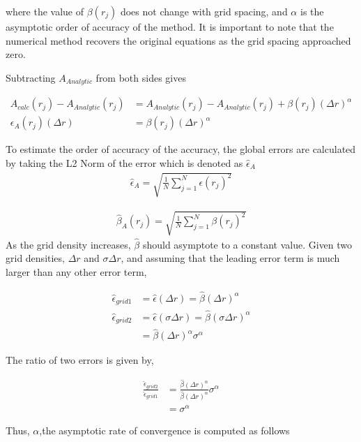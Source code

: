 where the value of $\beta(r_j)$ does not change with grid spacing, and 
$\alpha$ is the asymptotic order of accuracy of the method. It is important to
note that the numerical method recovers the original equations as the grid 
spacing approached zero.

Subtracting $A_{Analytic}$ from both sides gives

\begin{align*}
    A_{calc}(r_j) - A_{Analytic}(r_j) &= A_{Analytic}(r_j) - A_{Analytic}(r_j)
    + \beta(r_j) (\Delta r)^{\alpha} \\
    \epsilon_A(r_j)(\Delta r) &= \beta(r_j) (\Delta r)^{\alpha}
\end{align*}

To estimate the order of accuracy of the accuracy, the global errors 
are calculated by taking the L2 Norm of the error which is denoted as $\hat{\epsilon}_A$ 
\begin{align*}
    \hat{\epsilon}_A = \sqrt{\frac{1}{N}\sum_{j=1}^{N} \epsilon(r_j)^2  }
\end{align*}

\begin{align*}
    \hat{\beta}_A(r_j) = \sqrt{\frac{1}{N}\sum_{j=1}^{N} \beta(r_j)^2  }
\end{align*}
As the grid density increases, $\hat{\beta}$ should asymptote to a constant 
value. Given two grid densities, $\Delta r$ and $\sigma\Delta r$, and assuming
that the leading error term is much larger than any other error term,

\begin{align*}
    \hat{\epsilon}_{grid 1} &= \hat{\epsilon}(\Delta r) = \hat{\beta}(\Delta r)^{\alpha} \\
    \hat{\epsilon}_{grid 2} &= \hat{\epsilon}(\sigma \Delta r) = \hat{\beta}(\sigma \Delta r)^{\alpha} \\
                            &= \hat{\beta}(\Delta r)^{\alpha} \sigma^{\alpha}
\end{align*}

The ratio of two errors is given by,

\begin{align*}
    \frac{\hat{\epsilon}_{grid 2}}{\hat{\epsilon}_{grid 1}} &= 
    \frac{\hat{\beta}(\Delta r )^{\alpha}}{\hat{\beta}(\Delta r )^{\alpha}} \sigma^{\alpha} \\ &= \sigma^{\alpha}
\end{align*}

Thus, $\alpha$,the asymptotic rate of convergence is computed as follows 

